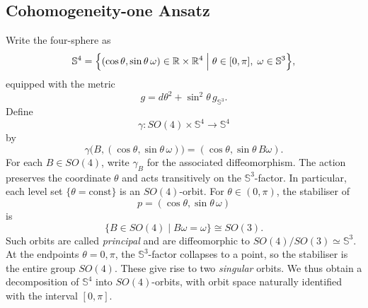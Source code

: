 \documentclass[11pt,a4paper]{article}
\numberwithin{equation}{section}
\theoremstyle{plain}
\theoremstyle{remark}
\begin{document}
\subsection{Cohomogeneity-one Ansatz}
Write the four-sphere as
$$
\mathbb{S}^4
=
\Bigl\{
(\cos\theta,\sin\theta\,\omega)
\in \mathbb{R}\times\mathbb{R}^4
\;\Big|\;
\theta\in[0,\pi],\;
\omega\in \mathbb{S}^3
\Bigr\},
$$
equipped with the metric
$$
g=d\theta^2+\sin^2\theta\,g_{\mathbb S^3}.
$$
Define
$$
\gamma:SO(4)\times\mathbb S^4\longrightarrow\mathbb S^4
$$
by
$$
\gamma\bigl(B,(\cos\theta,\sin\theta\,\omega)\bigr)
=
(\cos\theta,\sin\theta\,B\omega).
$$
For each $B\in SO(4)$, write $\gamma_B$ for the associated
diffeomorphism. The action preserves the coordinate $\theta$ and acts
transitively on the $\mathbb S^3$-factor. In particular, each level set
$\{\theta=\mathrm{const}\}$ is an $SO(4)$-orbit. For
$\theta\in(0,\pi)$, the stabiliser of
$$
p=(\cos\theta,\sin\theta\,\omega)
$$
is
$$
\{B\in SO(4)\mid B\omega=\omega\}\cong SO(3).
$$
Such orbits are called \emph{principal} and are diffeomorphic to
$SO(4)/SO(3)\simeq\mathbb S^3$. At the endpoints
$\theta=0,\pi$, the $\mathbb S^3$-factor collapses to a point, so the
stabiliser is the entire group $SO(4)$. These give rise to two
\emph{singular} orbits. We thus obtain a decomposition of
$\mathbb S^4$ into $SO(4)$-orbits, with orbit space naturally
identified with the interval $[0,\pi]$.
\end{document}
